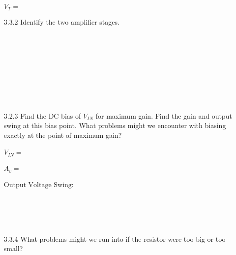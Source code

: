 \documentclass{article}
\begin{document}
\begin{enumerate}
  $\boxed{V_{T}	= ~~~~~~~~~~~~~~~~~~~~~~~}$
\item[3.3.2] Identify the two amplifier stages. \\ ~ \\
 \\~\\~\\~\\~\\~\\~\\
\item[3.2.3] Find the DC bias of $V_{IN}$ for maximum gain. Find the gain and output swing at this bias point. What problems might we encounter with biasing exactly at the point of maximum gain? \\ ~ \\
  $\boxed{V_{IN} = ~~~~~~~~~~~~~~~~~~~~~~~}$ \\ ~ \\
  $\boxed{A_v =    ~~~~~~~~~~~~~~~~~~~~~~~}$ \\ ~ \\
  $\boxed{\text{Output Voltage Swing: }~~~~~~~~~}$ \\ ~ \\ ~ \\ ~ \\ ~ \\
\item[3.3.4] What problems might we run into if the resistor were too big or too small? \\ ~ \\
  \\~\\~\\~\\~\\~\\~\\
\end{enumerate}
\end{document}

